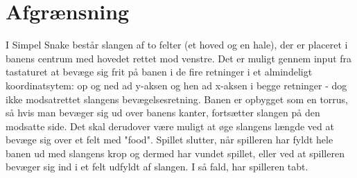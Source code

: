 \section{Afgrænsning}
I Simpel Snake består slangen af to felter (et hoved og en hale), der er placeret i banens centrum med hovedet rettet mod venstre. Det er muligt gennem input fra tastaturet at bevæge sig frit på banen i de fire retninger i et almindeligt koordinatsytem: op og ned ad y-aksen og hen ad x-aksen i begge retninger - dog ikke modsatrettet slangens bevægelsesretning. Banen er opbygget som en torrus, så hvis man bevæger sig ud over banens kanter, fortsætter slangen på den modsatte side. Det skal derudover være muligt at øge slangens længde ved at bevæge sig over et felt med "food". Spillet slutter, når spilleren har fyldt hele banen ud med slangens krop og dermed har vundet spillet, eller ved at spilleren bevæger sig ind i et felt udfyldt af slangen. I så fald, har spilleren tabt.